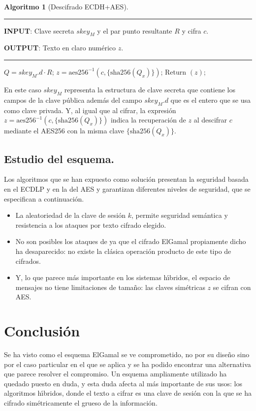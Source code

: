 \documentclass{cedi}%
\theoremstyle{plain}        			%
\theoremstyle{definition}   			%
\theoremstyle{saltolinea}   			%
\newtheorem{algo}{Algoritmo}
\begin{document}
\begin{algo}[Descifrado ECDH+AES]\label{alg:descifrado}
\parbox[b]{\linewidth}{%
\hrule
\smallskip
{\bf INPUT}: Clave secreta $skey_{M}$ y el par punto resultante $R$ y cifra $c$.

{\bf OUTPUT}: Texto en claro num\'erico $z$.
\vspace{1.5mm}
\hrule
}%
\begin{algorithmic}[1]
\STATE $Q=skey_{M}.d\cdot R$;
\STATE $z=\textrm{aes256}^{-1}(c,\{\textrm{sha256}(Q_x)\})$;
\STATE Return $(z)$;
\end{algorithmic}
\end{algo}

En este caso $skey_{M}$ representa la estructura de clave secreta que contiene los campos de la clave p\'ublica adem\'as del campo $skey_{M}.d$ que es el entero que se usa como clave privada. Y, al igual que al cifrar, la expresi\'on $z=\textrm{aes256}^{-1}(c,\{\textrm{sha256}(Q_x)\})$ indica la recuperaci\'on de $z$ al descifrar $c$ mediante el AES256 con la misma clave $\{\textrm{sha256}(Q_x)\}$.

\subsection*{Estudio del esquema.}

Los algoritmos que se han expuesto como soluci\'on presentan la seguridad basada en el ECDLP y en la del AES y garantizan diferentes niveles de seguridad, que se especifican a continuaci\'on.
\begin{itemize}
	\item La aleatoriedad de la clave de sesi\'on $k$, permite seguridad sem\'antica y resistencia a los ataques por texto cifrado elegido.
	\item No son posibles los ataques de \cite{insecure} ya que el cifrado ElGamal propiamente dicho ha desaparecido: no existe la cl\'asica operaci\'on producto de este tipo de cifrados.
	\item Y, lo que parece m\'as importante en los sistemas h\'{\i}bridos, el espacio de mensajes no tiene limitaciones de tama\~no: las claves sim\'etricas $z$ se cifran con AES.
\end{itemize}

\section{Conclusi\'on}

Se ha visto como el esquema ElGamal se ve comprometido, no por su dise\~no sino por el caso particular en el que se aplica y se ha podido encontrar una alternativa que parece resolver el compromiso. Un esquema ampliamente utilizado ha quedado puesto en duda, y esta duda afecta al m\'as importante de sus usos: los algoritmos h\'{\i}bridos, donde el texto a cifrar es una clave de sesi\'on con la que se ha cifrado sim\'etricamente el grueso de la informaci\'on.
\end{document}
